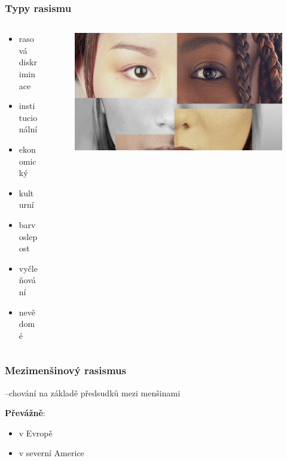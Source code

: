 \documentclass{beamer}
\begin{document}
\begin{frame}
\transwipe
{}
\frametitle{Typy rasismu}
\begin{columns}[onlytextwidth]
\begin{column}{0.4\textwidth}
\begin{itemize}
\item rasová diskriminace
\item institucionální
\item ekonomický
\item kulturní
\item barvoslepost
\item vyčleňování
\item nevědomé
\end{itemize}
\end{column}
\begin{column}{0.6\textwidth}
\begin{figure}
\includegraphics[scale=0.28]{colorblidness.eps}
\end{figure}
\end{column}
\end{columns}
\end{frame}

\begin{frame}
\transwipe
{}
\frametitle{Mezimenšinový rasismus}

\quad --\quad chování na základě předsudků mezi menšinami
\newline

\textbf{Převážně}:

\begin{itemize}
\item v Evropě
\item v severní Americe
\end{itemize}
\end{frame}
\end{document}
